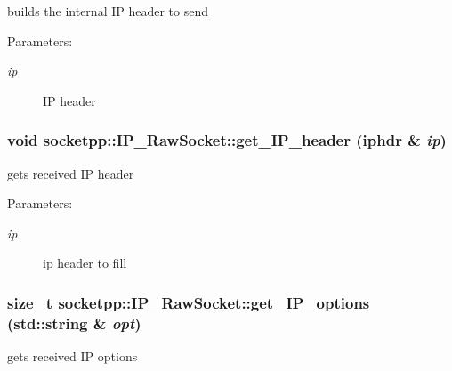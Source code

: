 builds the internal IP header to send 

\begin{Desc}
\item[Parameters:]
\begin{description}
\item[{\em ip}]IP header \end{description}
\end{Desc}
\hypertarget{classsocketpp_1_1IP__RawSocket_e477f483d5a8baa76c60399d0809d043}{
\subsubsection[{get\_\-IP\_\-header}]{\setlength{\rightskip}{0pt plus 5cm}void socketpp::IP\_\-RawSocket::get\_\-IP\_\-header (iphdr \& {\em ip})}}
\label{classsocketpp_1_1IP__RawSocket_e477f483d5a8baa76c60399d0809d043}


gets received IP header 

\begin{Desc}
\item[Parameters:]
\begin{description}
\item[{\em ip}]ip header to fill \end{description}
\end{Desc}
\hypertarget{classsocketpp_1_1IP__RawSocket_c9bec0c1db60871bb1cb5560b97e02ed}{
\subsubsection[{get\_\-IP\_\-options}]{\setlength{\rightskip}{0pt plus 5cm}size\_\-t socketpp::IP\_\-RawSocket::get\_\-IP\_\-options (std::string \& {\em opt})}}
\label{classsocketpp_1_1IP__RawSocket_c9bec0c1db60871bb1cb5560b97e02ed}


gets received IP options 

